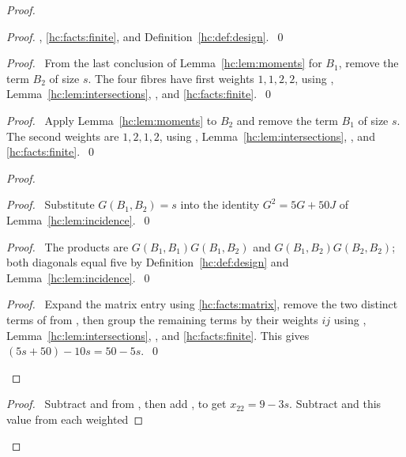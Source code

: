 \begin{mergedproofsection}
\begin{proof}
\begin{proof}
  , \ref{hc:facts:finite}, and
  Definition~\ref{hc:def:design}.~\qed\end{proof}
 \begin{proof}\pf\ From the last conclusion of Lemma~\ref{hc:lem:moments}
  for $B_1$, remove the term $B_2$ of size $s$. The four fibres have
  first weights $1,1,2,2$, using ,
  Lemma~\ref{hc:lem:intersections}, , and \ref{hc:facts:finite}.~\qed\end{proof}
 \begin{proof}\pf\ Apply Lemma~\ref{hc:lem:moments} to $B_2$ and remove
  the term $B_1$ of size $s$. The second weights are $1,2,1,2$,
  using , Lemma~\ref{hc:lem:intersections},
  , and \ref{hc:facts:finite}.~\qed\end{proof}
 \begin{proof}
  \begin{proof}\pf\ Substitute $G(B_1,B_2)=s$ into the identity
   $G^2=5G+50J$ of Lemma~\ref{hc:lem:incidence}.~\qed\end{proof}
  \begin{proof}\pf\ The products are $G(B_1,B_1)G(B_1,B_2)$ and
   $G(B_1,B_2)G(B_2,B_2)$; both diagonals equal five by
   Definition~\ref{hc:def:design} and Lemma~\ref{hc:lem:incidence}.~\qed\end{proof}
  \qedstep
  \begin{proof}\pf\ Expand the matrix entry using \ref{hc:facts:matrix},
   remove the two distinct terms of  from
   , then group the remaining terms by their
   weights $ij$ using ,
   Lemma~\ref{hc:lem:intersections}, , and
   \ref{hc:facts:finite}. This gives
   $(5s+50)-10s=50-5s$.~\qed\end{proof}
 \end{proof}
 \begin{proof}\pf\ Subtract  and
   from , then add
  , to get $x_{22}=9-3s$.
  Subtract  and this value from each weighted

\end{proof}
\end{proof}
\end{mergedproofsection}

